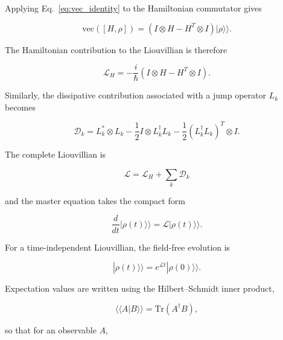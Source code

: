\documentclass[11pt]{article}
\begin{document}
Applying Eq.~\eqref{eq:vec_identity} to the Hamiltonian commutator
gives

\begin{equation}
\mathrm{vec}([H,\rho])
=
\left(
I\otimes H-H^{T}\otimes I
\right)
|\rho\rangle\rangle.
\end{equation}

The Hamiltonian contribution to the Liouvillian is therefore

\begin{equation}
\mathcal{L}_{H}
=
-\frac{i}{\hbar}
\left(
I\otimes H-H^{T}\otimes I
\right).
\label{eq:LH}
\end{equation}

Similarly, the dissipative contribution associated with a jump
operator $L_k$ becomes

\begin{equation}
\mathcal{D}_k
=
L_k^{*}\otimes L_k
-
\frac{1}{2}
I\otimes L_k^\dagger L_k
-
\frac{1}{2}
\left(
L_k^\dagger L_k
\right)^{T}
\otimes I.
\label{eq:dissipator_liouville}
\end{equation}

The complete Liouvillian is

\begin{equation}
\boxed{
\mathcal{L}
=
\mathcal{L}_{H}
+
\sum_k \mathcal{D}_k
}
\label{eq:full_liouvillian}
\end{equation}

and the master equation takes the compact form

\begin{equation}
\boxed{
\frac{d}{dt}
|\rho(t)\rangle\rangle
=
\mathcal{L}
|\rho(t)\rangle\rangle.
}
\label{eq:liouville_master}
\end{equation}

For a time-independent Liouvillian, the field-free evolution is

\begin{equation}
|\rho(t)\rangle\rangle
=
e^{\mathcal{L}t}
|\rho(0)\rangle\rangle.
\label{eq:liouville_propagator}
\end{equation}

Expectation values are written using the Hilbert--Schmidt inner
product,

\begin{equation}
\langle\!\langle A|B\rangle\!\rangle
=
\mathrm{Tr}
\left(
A^\dagger B
\right),
\label{eq:hilbert_schmidt}
\end{equation}

so that for an observable $A$,
\end{document}
